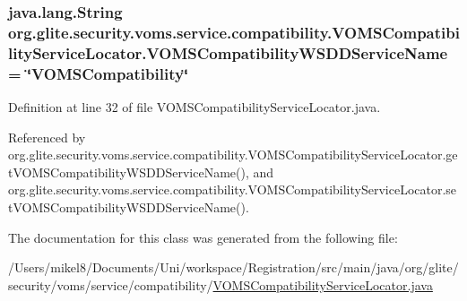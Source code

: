 \hypertarget{classorg_1_1glite_1_1security_1_1voms_1_1service_1_1compatibility_1_1VOMSCompatibilityServiceLocator_a7e668f5502e13d2b520cab0b1b8f30b4}{
\subsubsection[{VOMSCompatibilityWSDDServiceName}]{\setlength{\rightskip}{0pt plus 5cm}java.lang.String {\bf org.glite.security.voms.service.compatibility.VOMSCompatibilityServiceLocator.VOMSCompatibilityWSDDServiceName} = \char`\"{}VOMSCompatibility\char`\"{}}}
\label{classorg_1_1glite_1_1security_1_1voms_1_1service_1_1compatibility_1_1VOMSCompatibilityServiceLocator_a7e668f5502e13d2b520cab0b1b8f30b4}


Definition at line 32 of file VOMSCompatibilityServiceLocator.java.



Referenced by org.glite.security.voms.service.compatibility.VOMSCompatibilityServiceLocator.getVOMSCompatibilityWSDDServiceName(), and org.glite.security.voms.service.compatibility.VOMSCompatibilityServiceLocator.setVOMSCompatibilityWSDDServiceName().



The documentation for this class was generated from the following file:\begin{DoxyCompactItemize}
\item 
/Users/mikel8/Documents/Uni/workspace/Registration/src/main/java/org/glite/security/voms/service/compatibility/\hyperlink{VOMSCompatibilityServiceLocator_8java}{VOMSCompatibilityServiceLocator.java}\end{DoxyCompactItemize}
